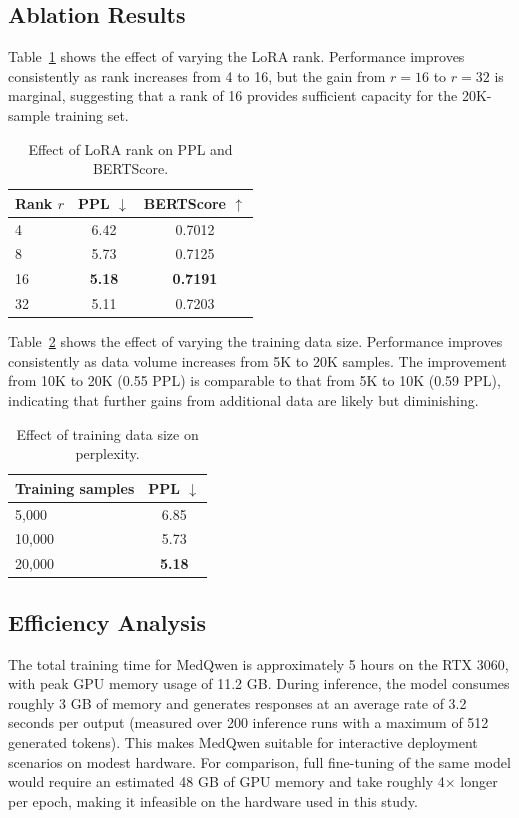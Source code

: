 \documentclass[12pt,a4paper]{article}
\begin{document}
\subsection{Ablation Results}

Table~\ref{tab:ablation_rank} shows the effect of varying the LoRA rank. Performance improves consistently as rank increases from 4 to 16, but the gain from $r=16$ to $r=32$ is marginal, suggesting that a rank of 16 provides sufficient capacity for the 20K-sample training set.

\begin{table}[ht]
\centering
\caption{Effect of LoRA rank on PPL and BERTScore.}
\label{tab:ablation_rank}
\begin{tabular}{lcc}
\toprule
\textbf{Rank $r$} & \textbf{PPL $\downarrow$} & \textbf{BERTScore $\uparrow$} \\
\midrule
4 & 6.42 & 0.7012 \\
8 & 5.73 & 0.7125 \\
16 & \textbf{5.18} & \textbf{0.7191} \\
32 & 5.11 & 0.7203 \\
\bottomrule
\end{tabular}
\end{table}

Table~\ref{tab:ablation_data} shows the effect of varying the training data size. Performance improves consistently as data volume increases from 5K to 20K samples. The improvement from 10K to 20K (0.55 PPL) is comparable to that from 5K to 10K (0.59 PPL), indicating that further gains from additional data are likely but diminishing.

\begin{table}[ht]
\centering
\caption{Effect of training data size on perplexity.}
\label{tab:ablation_data}
\begin{tabular}{lc}
\toprule
\textbf{Training samples} & \textbf{PPL $\downarrow$} \\
\midrule
5,000  & 6.85 \\
10,000 & 5.73 \\
20,000 & \textbf{5.18} \\
\bottomrule
\end{tabular}
\end{table}

\subsection{Efficiency Analysis}

The total training time for MedQwen is approximately 5 hours on the RTX 3060, with peak GPU memory usage of 11.2 GB. During inference, the model consumes roughly 3 GB of memory and generates responses at an average rate of 3.2 seconds per output (measured over 200 inference runs with a maximum of 512 generated tokens). This makes MedQwen suitable for interactive deployment scenarios on modest hardware. For comparison, full fine-tuning of the same model would require an estimated 48 GB of GPU memory and take roughly 4$\times$ longer per epoch, making it infeasible on the hardware used in this study.
\end{document}
